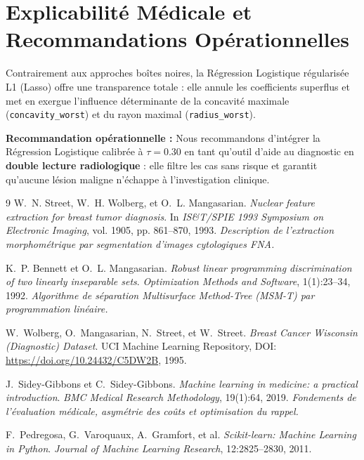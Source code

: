 \documentclass[a4paper,11pt]{report}
\begin{document}
\section{Explicabilité Médicale et Recommandations Opérationnelles}
Contrairement aux approches boîtes noires, la Régression Logistique régularisée L1 (Lasso) offre une transparence totale : elle annule les coefficients superflus et met en exergue l'influence déterminante de la concavité maximale (\texttt{concavity\_worst}) et du rayon maximal (\texttt{radius\_worst}).

\textbf{Recommandation opérationnelle :} Nous recommandons d'intégrer la Régression Logistique calibrée à $\tau = 0.30$ en tant qu'outil d'aide au diagnostic en \textbf{double lecture radiologique} : elle filtre les cas sans risque et garantit qu'aucune lésion maligne n'échappe à l'investigation clinique.

\clearpage
\pagestyle{frontback}
\setcounter{page}{1}

\renewcommand{\bibname}{Bibliographie \& Références Académiques}

\begingroup
\small
\begin{thebibliography}{9}
	\setlength{\itemsep}{3pt}
	\setlength{\parskip}{1pt}
	W.~N. Street, W.~H. Wolberg, et O.~L. Mangasarian.
	\newblock \emph{Nuclear feature extraction for breast tumor diagnosis}.
	\newblock In \emph{IS\&T/SPIE 1993 Symposium on Electronic Imaging}, vol. 1905, pp. 861--870, 1993.
	\newblock \emph{Description de l'extraction morphométrique par segmentation d'images cytologiques FNA.}

	K.~P. Bennett et O.~L. Mangasarian.
	\newblock \emph{Robust linear programming discrimination of two linearly inseparable sets}.
	\newblock \emph{Optimization Methods and Software}, 1(1):23--34, 1992.
	\newblock \emph{Algorithme de séparation Multisurface Method-Tree (MSM-T) par programmation linéaire.}

	W.~Wolberg, O.~Mangasarian, N.~Street, et W.~Street.
	\newblock \emph{Breast Cancer Wisconsin (Diagnostic) Dataset}.
	\newblock UCI Machine Learning Repository, DOI: \url{https://doi.org/10.24432/C5DW2B}, 1995.

	J.~Sidey-Gibbons et C.~Sidey-Gibbons.
	\newblock \emph{Machine learning in medicine: a practical introduction}.
	\newblock \emph{BMC Medical Research Methodology}, 19(1):64, 2019.
	\newblock \emph{Fondements de l'évaluation médicale, asymétrie des coûts et optimisation du rappel.}

	F.~Pedregosa, G.~Varoquaux, A.~Gramfort, et al.
	\newblock \emph{Scikit-learn: Machine Learning in Python}.
	\newblock \emph{Journal of Machine Learning Research}, 12:2825--2830, 2011.
\end{thebibliography}
\endgroup
\end{document}
